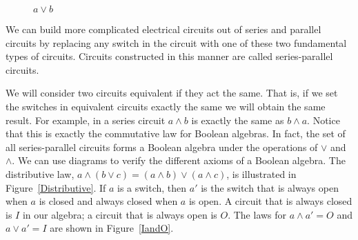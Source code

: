 \begin{figure}[htb]
\begin{center}
\end{center}
\caption{$a \vee b$}
\label{Parallel}
\end{figure}
 
 
We can build more complicated electrical circuits out of series and
parallel circuits by replacing any switch in the circuit with one of
these two fundamental types of circuits. Circuits constructed in this
manner are called {\bfi series-parallel
circuits}. 
 
 
 
We will consider two circuits equivalent if they act the same.
That is, if we set the switches in equivalent circuits exactly the
same we will obtain the same result.  For example, in a series circuit
$a \wedge b$ is exactly the same as $b \wedge a$.  Notice that this is
exactly the commutative law for Boolean algebras. In fact, the set of
all series-parallel circuits forms a Boolean algebra under the
operations of $\vee$ and $\wedge$. We can use diagrams to verify the
different axioms of a Boolean algebra. The distributive law, $a
\wedge ( b \vee c ) = (a \wedge b ) \vee ( a \wedge c )$,  is
illustrated in Figure~\ref{Distributive}. 
If $a$ is a switch, then $a'$ is the switch that is always open when
$a$ is closed and always closed when $a$ is open. A circuit that is
always closed is $I$ in our algebra; a circuit that is always
open is $O$. The laws for $a \wedge a' = O$ and $a \vee
a' = I$ are shown in Figure~\ref{IandO}.  



